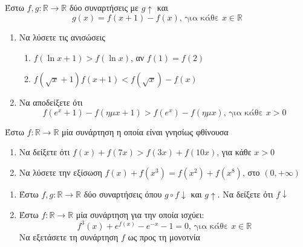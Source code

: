 \documentclass{presentation}
\begin{document}
\begin{askisi}
      Έστω $f,g:\mathbb{R}\to\mathbb{R}$ δύο συναρτήσεις με $g\uparrow$ και
      $$g(x)=f(x+1)-f(x)\text{, για κάθε } x\in\mathbb{R}$$
      \begin{enumerate}
            \item Να λύσετε τις ανισώσεις
                  \begin{enumerate}
                        \item $f(\ln x+1)>f(\ln x)$, αν $f(1)=f(2)$ \pause
                        \item $f(\sqrt{x}+1)f(x+1)<f(\sqrt{x})-f(x)$ \pause
                  \end{enumerate}
            \item Να αποδείξετε ότι  \pause
                  $$f(e^x+1)-f(ημ x+1)>f(e^x)-f(ημ x)\text{, για κάθε } x>0$$
      \end{enumerate}
\end{askisi}

\begin{askisi}
      Έστω $f:\mathbb{R}\to\mathbb{R}$ μία συνάρτηση η οποία είναι γνησίως φθίνουσα
      \begin{enumerate}
            \item Να δείξετε ότι $f(x)+f(7x)>f(3x)+f(10x)$, για κάθε $x>0$ \pause
            \item Να λύσετε την εξίσωση $f(x)+f(x^3)=f(x^2)+f(x^8)$, στο $(0,+\infty)$
      \end{enumerate}
\end{askisi}

\begin{askisi}

      \begin{enumerate}
            \item Έστω $f,g:\mathbb{R}\to\mathbb{R}$ δύο συναρτήσεις όπου $g\circ f \downarrow$ και $g\uparrow$. Να δείξετε ότι $f\downarrow$ \pause
            \item Έστω $f:\mathbb{R}\to\mathbb{R}$ μία συνάρτηση για την οποία ισχύει:
                  $$f^3(x)+e^{f(x)}-e^{-x}-1=0\text{, για κάθε } x\in\mathbb{R}$$
                  Να εξετάσετε τη συνάρτηση $f$ ως προς τη μονοτνία
      \end{enumerate}
\end{askisi}
\end{document}

